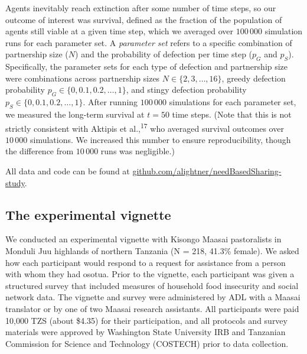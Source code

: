 \documentclass[
]{article}
\begin{document}
Agents inevitably reach extinction after some number of time steps, so our outcome of interest was survival, defined as the fraction of the population of agents still viable at a given time step, which we averaged over \(100\,000\) simulation runs for each parameter set. A \emph{parameter set} refers to a specific combination of partnership size (\(N\)) and the probability of defection per time step (\(p_G\) and \(p_S\)). Specifically, the parameter sets for each type of defection and partnership size were combinations across partnership sizes \(N \in \{ 2, 3, \dots, 16 \}\), greedy defection probability \(p_G \in \{0, 0.1, 0.2, \dots, 1\}\), and stingy defection probability \(p_S \in \{0, 0.1, 0.2, \dots, 1\}\). After running \(100\,000\) simulations for each parameter set, we measured the long-term survival at \(t=50\) time steps. (Note that this is not strictly consistent with Aktipis et al.,\textsuperscript{17} who averaged survival outcomes over \(10\,000\) simulations. We increased this number to ensure reproducibility, though the difference from \(10\,000\) runs was negligible.)

All data and code can be found at \href{https://github.com/alightner/needBasedSharing-study}{github.com/alightner/needBasedSharing-study}.

\subsection*{The experimental vignette}\label{experimentmethods}

We conducted an experimental vignette with Kisongo Maasai pastoralists in Monduli Juu highlands of northern Tanzania (N = 218, 41.3\% female). We asked how each participant would respond to a request for assistance from a person with whom they had osotua. Prior to the vignette, each participant was given a structured survey that included measures of household food insecurity and social network data. The vignette and survey were administered by ADL with a Maasai translator or by one of two Maasai research assistants. All participants were paid 10,000 TZS (about \$4.35) for their participation, and all protocols and survey materials were approved by Washington State University IRB and Tanzanian Commission for Science and Technology (COSTECH) prior to data collection.
\end{document}
